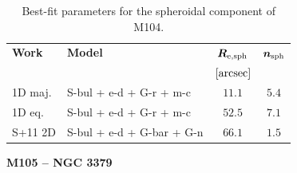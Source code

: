 \documentclass[preprint2]{emulateapj}
\begin{document}
  \begin{table}[h]
  \small
  \caption{Best-fit parameters for the spheroidal component of M104.}
  \begin{center}
  \begin{tabular}{llcc}
  \hline
  {\bf Work} & {\bf Model}   & $\bm R_{\rm e,sph}$    & $\bm n_{\rm sph}$ \\
    &  &  $[\rm arcsec]$ & \\
  \hline
  1D maj. & S-bul + e-d + G-r + m-c  & $11.1$  &  $5.4$ \\
  1D eq.  & S-bul + e-d + G-r + m-c  & $52.5$  &  $7.1$ \\
  \hline
  S+11 2D         & S-bul + e-d + G-bar + G-n  & $66.1$  &  $1.5$ \\
  \hline
  \end{tabular}
  \end{center}
  \label{tab:m104}
  \end{table}


  \clearpage\newpage\noindent
  {\bf M105 -- NGC 3379 \\}
\end{document}
